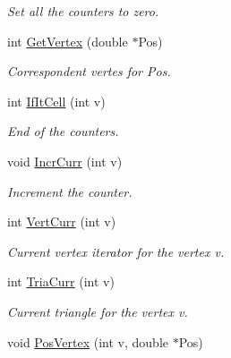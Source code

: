 \begin{DoxyCompactItemize}
\begin{DoxyCompactList}\small\item\em Set all the counters to zero. \end{DoxyCompactList}\item 
int \hyperlink{classNeiVertex_a330eb7ef3b6ff289f9428fd4994209af}{Get\+Vertex} (double $\ast$Pos)\hypertarget{classNeiVertex_a330eb7ef3b6ff289f9428fd4994209af}{}\label{classNeiVertex_a330eb7ef3b6ff289f9428fd4994209af}

\begin{DoxyCompactList}\small\item\em Correspondent vertes for Pos. \end{DoxyCompactList}\item 
int \hyperlink{classNeiVertex_adb170c151213885180aba70f23ac7452}{If\+It\+Cell} (int v)\hypertarget{classNeiVertex_adb170c151213885180aba70f23ac7452}{}\label{classNeiVertex_adb170c151213885180aba70f23ac7452}

\begin{DoxyCompactList}\small\item\em End of the counters. \end{DoxyCompactList}\item 
void \hyperlink{classNeiVertex_afefd8d5278268d8224caba5312860e5d}{Incr\+Curr} (int v)\hypertarget{classNeiVertex_afefd8d5278268d8224caba5312860e5d}{}\label{classNeiVertex_afefd8d5278268d8224caba5312860e5d}

\begin{DoxyCompactList}\small\item\em Increment the counter. \end{DoxyCompactList}\item 
int \hyperlink{classNeiVertex_a072488de60aa6fce524b79855cb53ec5}{Vert\+Curr} (int v)\hypertarget{classNeiVertex_a072488de60aa6fce524b79855cb53ec5}{}\label{classNeiVertex_a072488de60aa6fce524b79855cb53ec5}

\begin{DoxyCompactList}\small\item\em Current vertex iterator for the vertex v. \end{DoxyCompactList}\item 
int \hyperlink{classNeiVertex_aebbce34f5213484c16fe08591fe0f8d7}{Tria\+Curr} (int v)\hypertarget{classNeiVertex_aebbce34f5213484c16fe08591fe0f8d7}{}\label{classNeiVertex_aebbce34f5213484c16fe08591fe0f8d7}

\begin{DoxyCompactList}\small\item\em Current triangle for the vertex v. \end{DoxyCompactList}\item 
void \hyperlink{classNeiVertex_a81093b4cb48a3e1598c724287c410a9d}{Pos\+Vertex} (int v, double $\ast$Pos)\hypertarget{classNeiVertex_a81093b4cb48a3e1598c724287c410a9d}{}\label{classNeiVertex_a81093b4cb48a3e1598c724287c410a9d}


\end{DoxyCompactItemize}
